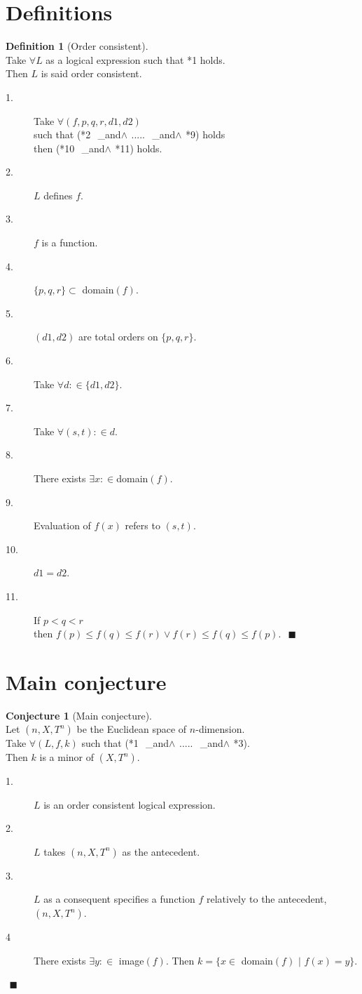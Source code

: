 \newqed\documentclass{article}
\theoremstyle{definition}
\newtheorem{definition}{Definition}[section]
\newtheorem{conjecture}{Conjecture}[section]
\newcommand{\newspc}{\textcolor{white}{s}}
\newcommand{\newqed}{\newspc{\hfill\color{ocre}\ensuremath{\blacksquare}}}
\newcommand{\newland}{\newspc_{and}$\land$\newspc}
\begin{document}
\section{Definitions}



\begin{definition}[Order consistent]
\newspc\\Take $\forall L$ as a logical expression such that *1 holds. 
\\Then $L$ is said order consistent.
\begin{description}
\item [1.] Take $\forall (f,p,q,r,d1,d2)$ 
\\such that (*2 \newland ..... \newland *9) holds
\\then (*10 \newland *11) holds. 
\item [2.] $L$ defines $f$.
\item[3.] $f$ is a function. 
\item[4.] $\{p,q,r\}\subset$ domain$(f)$.
\item[5.] $(d1,d2)$ are total orders on $\{p,q,r\}$.
\item [6.] Take $\forall d:\in \{d1,d2\}$.
\item[7.] Take $\forall (s,t):\in d$.
\item[8.] There exists $\exists x:\in$domain$(f)$.
\item[9.] Evaluation of $f(x)$ refers to $(s,t)$.
\item [10.] $d1=d2$.
\item [11.]If $p< q< r$ 
\\then $f(p)\leq f(q) \leq f(r) \vee  f(r)\leq f(q) \leq f(p)$.
\newqed
\end{description}
\end{definition}

\section{Main conjecture}

\begin{conjecture}[Main conjecture]

\newspc \\Let $(n,X,T^n)$ be the Euclidean space of $n$-dimension.
\\Take $\forall (L,f,k)$ such that (*1  \newland ..... \newland *3).
\\Then $k$ is a minor of $(X,T^n)$.
\begin{description}
\item[1.] $L$ is an order consistent logical expression.
\item[2.] $L$ takes $(n,X,T^n)$ as the antecedent.
\item[3.] $L$ as a consequent specifies a function $f$ relatively to the antecedent,$(n,X,T^n)$.
\item[4] There exists $\exists y:\in$ image$(f)$. Then $k=\{x\in$ domain$(f)$ $|$ $f(x)=y\}$.
\end{description}
\newqed
\end{conjecture}
\\
\end{document}
